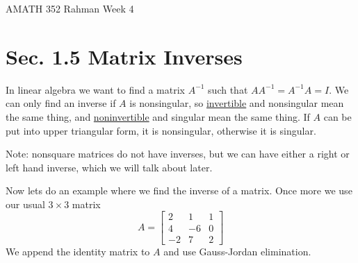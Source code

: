 \documentclass[reqno]{amsart}
\theoremstyle{definition}
\begin{document}
\begin{flushleft}
{\sc \Large AMATH 352 Rahman} \hfill Week 4
\bigskip
\end{flushleft}

\newcommand{\R}{\mathbb{R}}
\newcommand{\N}{\mathbb{N}}
\newcommand{\Z}{\mathbb{Z}}
\newcommand{\Q}{\mathbb{Q}}
\renewcommand{\CancelColor}{\color{red}}
\newcommand{\?}{\stackrel{?}{=}}
\renewcommand{\varphi}{\phi}
\newcommand{\card}{\text{Card}}
\newcommand{\bigzero}{\text{\Huge 0}}
\newcommand{\curvearrowdown}{{\color{red}\rotatebox{90}{$\curvearrowleft$}}}
\newcommand{\curvearrowup}{{\color{red}\rotatebox{90}{$\curvearrowright$}}}



\section*{Sec. 1.5 Matrix Inverses}

In linear algebra we want to find a matrix $A^{-1}$ such that $AA^{-1} = A^{-1}A = I$.
We can only find an inverse if $A$ is nonsingular, so \underline{invertible} and nonsingular
mean the same thing, and \underline{noninvertible} and singular mean the same thing.
If $A$ can be put into upper triangular form, it is nonsingular, otherwise it is singular.

Note:  nonsquare matrices do not have inverses, but we can have either a right or left hand
inverse, which we will talk about later.

Now lets do an example where we find the inverse of a matrix.  Once more we use our usual $3 \times 3$
matrix
%
\begin{equation}
A = \begin{bmatrix}
2 & 1 & 1\\
4 & -6 & 0\\
-2 & 7 & 2
\end{bmatrix}
\end{equation}
%
We append the identity matrix to $A$ and use Gauss-Jordan elimination.
\end{document}
